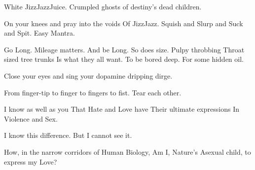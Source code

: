 \documentclass{article}
\begin{document}
White JizzJazzJuice. Crumpled ghosts of destiny's dead children.
\newline 
\newline

On your knees and  pray into the voids \newline Of JizzJazz. \newline
Squish and Slurp and Suck and Spit. \newline Easy Mantra. \newline
\newline


Go Long. Mileage matters. 
\newline 
And be Long. So does size. 
\newline 
Pulpy throbbing \newline Throat sized tree trunks \newline Is what they
all want. \newline To be bored deep. \newline For some hidden oil.
\newline \newline

Close your eyes and sing your dopamine dripping dirge. 
\newline
\newline

From finger-tip to finger to fingers to fist. Tear each other.
\newline
\newline

I know as well as you 
\newline
That Hate and Love have 
\newline
Their ultimate expressions 
\newline
In Violence and Sex. 
\newline

I know this difference.
\newline
But I cannot see it. 
\newline
\newline

How, in the narrow corridors of Human Biology, \newline Am I, Nature's
Asexual child, to express my Love?
\end{document}
